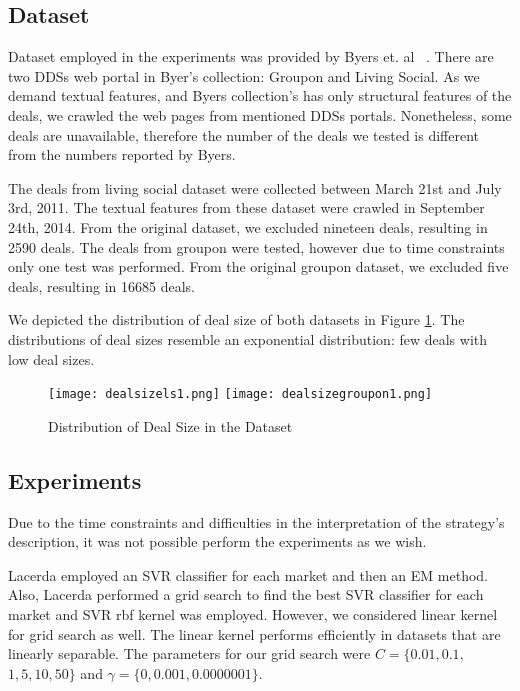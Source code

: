 \documentclass{acm_proc_article-sp}
\begin{document}
\subsection{Dataset}

Dataset employed in the experiments was provided by Byers et. al ~\cite{BMZ12}.
There are two DDSs web portal in Byer's collection: Groupon and Living Social. 
As we demand textual features, and Byers collection's has only structural 
features of the deals, we crawled the web pages from mentioned DDSs portals. 
Nonetheless, some deals are unavailable, therefore the number of the deals 
we tested is different from the numbers reported by Byers.


The deals from living social dataset were collected between March 21st and 
July 3rd, 2011. The textual features from these dataset were crawled in 
September 24th, 2014. From the original dataset, we excluded nineteen deals, 
resulting in 2590 deals. The deals from groupon were tested, however due to 
time constraints only one test was performed. From the original groupon 
dataset, we excluded five deals, resulting in 16685 deals.

We depicted the distribution of deal size of 
both datasets in Figure \ref{dealsize}. The distributions of deal 
sizes resemble an exponential distribution: few deals with low deal sizes. 

\begin{figure}[H]
    \centering
    \texttt{[image: dealsizels1.png]}
    \texttt{[image: dealsizegroupon1.png]}
    \caption{Distribution of Deal Size in the Dataset}
    \label{dealsize}
\end{figure}


\subsection{Experiments}

Due to the time constraints and difficulties in the interpretation of 
 the strategy's description, it was not possible perform the 
experiments as we wish. 

Lacerda employed an SVR classifier for each market and then 
an EM method. Also, Lacerda performed 
a grid search to find the best SVR classifier for each market 
and SVR rbf kernel was employed. However, we considered linear 
kernel for grid search as well. The linear kernel performs  
efficiently in datasets that are linearly separable. The parameters for 
our grid search were $C = \{0.01,0.1,$$1,5,10,50\}$ and 
$\gamma = \{0,0.001,0.0000001\}$.
\end{document}
